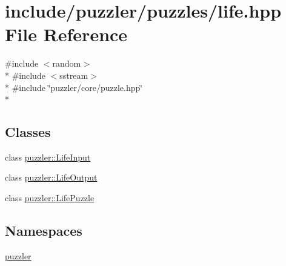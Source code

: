\hypertarget{a00130}{}\section{include/puzzler/puzzles/life.hpp File Reference}
\label{a00130}
{\ttfamily \#include $<$random$>$}\\*
{\ttfamily \#include $<$sstream$>$}\\*
{\ttfamily \#include \char`\"{}puzzler/core/puzzle.\+hpp\char`\"{}}\\*
\subsection*{Classes}
\begin{DoxyCompactItemize}
\item 
class \hyperlink{a00010}{puzzler\+::\+Life\+Input}
\item 
class \hyperlink{a00011}{puzzler\+::\+Life\+Output}
\item 
class \hyperlink{a00013}{puzzler\+::\+Life\+Puzzle}
\end{DoxyCompactItemize}
\subsection*{Namespaces}
\begin{DoxyCompactItemize}
\item 
 \hyperlink{a00145}{puzzler}
\end{DoxyCompactItemize}
